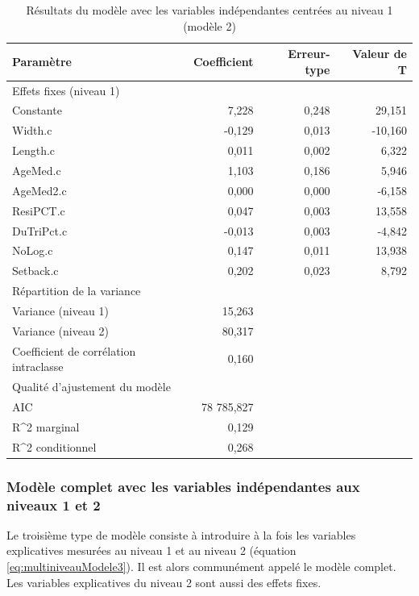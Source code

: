 \documentclass[
  11pt,
  french,
]{book}
\begin{document}
\begin{table}

\caption{\label{tab:TableauModele2b}Résultats du modèle avec les variables indépendantes centrées au niveau 1 (modèle 2)}
\centering
\fontsize{8}{10}\selectfont
\begin{tabular}[t]{lrrr}
\toprule
Paramètre & Coefficient & Erreur-type & Valeur de T\\
\midrule
Effets fixes (niveau 1) &  &  & \\
Constante & 7,228 & 0,248 & 29,151\\
Width.c & -0,129 & 0,013 & -10,160\\
Length.c & 0,011 & 0,002 & 6,322\\
AgeMed.c & 1,103 & 0,186 & 5,946\\
\addlinespace
AgeMed2.c & 0,000 & 0,000 & -6,158\\
ResiPCT.c & 0,047 & 0,003 & 13,558\\
DuTriPct.c & -0,013 & 0,003 & -4,842\\
NoLog.c & 0,147 & 0,011 & 13,938\\
Setback.c & 0,202 & 0,023 & 8,792\\
\addlinespace
Répartition de la variance &  &  & \\
Variance (niveau 1) & 15,263 &  & \\
Variance (niveau 2) & 80,317 &  & \\
Coefficient de corrélation intraclasse & 0,160 &  & \\
Qualité d'ajustement du modèle &  &  & \\
\addlinespace
AIC & 78 785,827 &  & \\
R\textasciicircum{2} marginal & 0,129 &  & \\
R\textasciicircum{2} conditionnel & 0,268 &  & \\
\bottomrule
\end{tabular}
\end{table}

\hypertarget{sect08223}{%
\subsubsection{Modèle complet avec les variables indépendantes aux niveaux 1 et 2}\label{sect08223}}

Le troisième type de modèle consiste à introduire à la fois les variables explicatives mesurées au niveau 1 et au niveau 2 (équation \eqref{eq:multiniveauModele3}). Il est alors communément appelé le modèle complet. Les variables explicatives du niveau 2 sont aussi des effets fixes.
\end{document}
